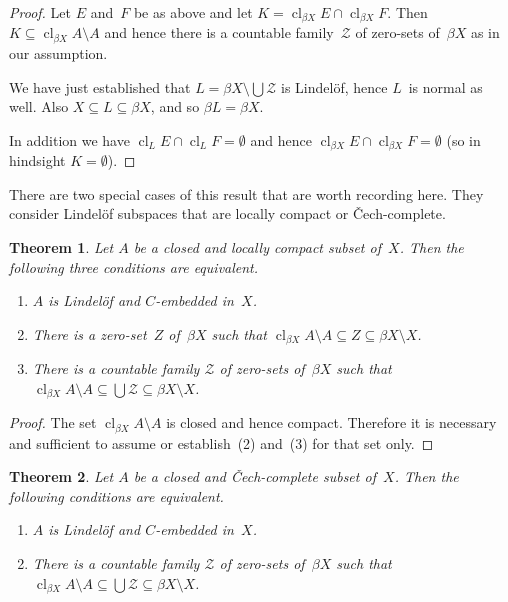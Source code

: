 \documentclass[a4paper]{amsart}
\newcommand\calZ{\mathcal{Z}}
\newcommand\cl{\operatorname{cl}}
\newcommand\clbeta[1][X]{\cl_{\beta #1}}
\theoremstyle{plain}
\newtheorem{theorem}{Theorem}[section]
\theoremstyle{definition}
\theoremstyle{remark}
\begin{document}
\begin{proof}
\smallskip
Let $E$ and~$F$ be as above and let $K=\clbeta E\cap\clbeta F$.
Then $K\subseteq\clbeta A\setminus A$ and hence there is a
countable family~$\calZ$ of zero-sets of~$\beta X$ as in our assumption.

We have just established that $L=\beta X\setminus\bigcup\calZ$ 
is Lindel\"of, hence $L$~is normal as well.
Also $X\subseteq L\subseteq\beta X$, and so $\beta L=\beta X$.

In addition we have $\cl_LE\cap\cl_LF=\emptyset$ and hence 
$\clbeta E\cap\clbeta F=\emptyset$ (so in hindsight $K=\emptyset$).
\end{proof}

There are two special cases of this result that are worth recording here.
They consider Lindel\"of subspaces that are locally compact or 
\v{C}ech-complete.

\begin{theorem}
Let $A$ be a closed and locally compact subset of~$X$.
Then the following three conditions are equivalent.
\begin{enumerate}
\item $A$ is Lindel\"of and $C$-embedded in~$X$.
\item There is a zero-set~$Z$ of~$\beta X$ such that 
      $\clbeta A\setminus A\subseteq Z\subseteq\beta X\setminus X$.
\item There is a countable family $\calZ$ of zero-sets of~$\beta X$ such that 
      $\clbeta A\setminus A\subseteq\bigcup\calZ\subseteq\beta X\setminus X$.
\end{enumerate}
\end{theorem}

\begin{proof}
The set $\clbeta A\setminus A$ is closed and hence compact.
Therefore it is necessary and sufficient to assume or establish~(2) 
and~(3) for that set only.  
\end{proof}


\begin{theorem}\label{thm.Cech}
Let $A$ be a closed and \v{C}ech-complete subset of~$X$.
Then the following conditions are equivalent.
\begin{enumerate}
\item $A$ is Lindel\"of and $C$-embedded in~$X$.
\item There is a countable family $\calZ$ of zero-sets of~$\beta X$ such that 
      $\clbeta A\setminus A\subseteq\bigcup\calZ\subseteq\beta X\setminus X$.
\end{enumerate}
\end{theorem}
\end{document}
